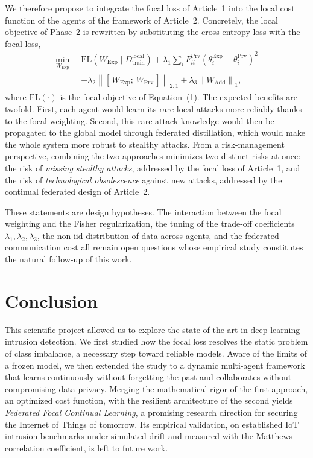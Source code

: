 \documentclass[11pt,a4paper]{article}
\begin{document}
We therefore propose to integrate the focal loss of Article~1 into the local cost function of the agents of the framework of Article~2. Concretely, the local objective of Phase~2 is rewritten by substituting the cross-entropy loss with the focal loss,
\begin{equation}
\begin{aligned}
\min_{W_{\mathrm{Exp}}} \;\; & \mathrm{FL}\!\left(W_{\mathrm{Exp}} \mid D^{\mathrm{local}}_{\mathrm{train}}\right)
+ \lambda_1 \sum_i F^{\mathrm{Prv}}_{ii}\left(\theta^{\mathrm{Exp}}_i - \theta^{\mathrm{Prv}}_i\right)^2 \\[2pt]
& + \lambda_2 \left\lVert [\,W_{\mathrm{Exp}};\, W_{\mathrm{Prv}}\,] \right\rVert_{2,1}
+ \lambda_3 \left\lVert W_{\mathrm{Add}} \right\rVert_1 ,
\end{aligned}
\end{equation}
where $\mathrm{FL}(\cdot)$ is the focal objective of Equation~(1). The expected benefits are twofold. First, each agent would learn its rare local attacks more reliably thanks to the focal weighting. Second, this rare-attack knowledge would then be propagated to the global model through federated distillation, which would make the whole system more robust to stealthy attacks. From a risk-management perspective, combining the two approaches minimizes two distinct risks at once: the risk of \emph{missing stealthy attacks}, addressed by the focal loss of Article~1, and the risk of \emph{technological obsolescence} against new attacks, addressed by the continual federated design of Article~2.

These statements are design hypotheses. The interaction between the focal weighting and the Fisher regularization, the tuning of the trade-off coefficients $\lambda_1,\lambda_2,\lambda_3$, the non-iid distribution of data across agents, and the federated communication cost all remain open questions whose empirical study constitutes the natural follow-up of this work.

\section{Conclusion}

This scientific project allowed us to explore the state of the art in deep-learning intrusion detection. We first studied how the focal loss resolves the static problem of class imbalance, a necessary step toward reliable models. Aware of the limits of a frozen model, we then extended the study to a dynamic multi-agent framework that learns continuously without forgetting the past and collaborates without compromising data privacy. Merging the mathematical rigor of the first approach, an optimized cost function, with the resilient architecture of the second yields \emph{Federated Focal Continual Learning}, a promising research direction for securing the Internet of Things of tomorrow. Its empirical validation, on established IoT intrusion benchmarks under simulated drift and measured with the Matthews correlation coefficient, is left to future work.
\end{document}
